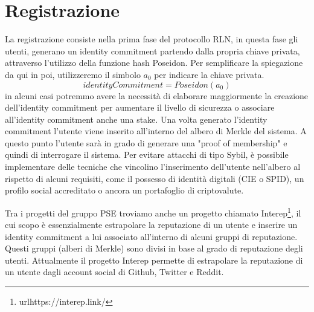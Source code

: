 \section{Registrazione}
La registrazione consiste nella prima fase del protocollo RLN, in questa fase gli utenti, generano un identity
commitment partendo dalla propria chiave privata, attraverso l'utilizzo della funzione hash Poseidon. Per semplificare
la spiegazione da qui in poi, utilizzeremo il simbolo $a_0$ per indicare la chiave privata.
$$identityCommitment = Poseidon(a_0)$$ in alcuni casi potremmo avere la necessità di elaborare maggiormente la creazione
dell'identity commitment per aumentare il livello di sicurezza o associare all'identity commitment anche una stake. Una
volta generato l'identity commitment l'utente viene inserito all'interno del albero di Merkle del sistema. A questo
punto l'utente sarà in grado di generare una "proof of membership" e quindi di interrogare il sistema. Per evitare
attacchi di tipo Sybil, è possibile implementare delle tecniche che vincolino l'inserimento dell'utente nell'albero al
rispetto di alcuni requisiti, come il possesso di identità digitali (CIE o SPID), un profilo social accreditato o ancora
un portafoglio di criptovalute.

Tra i progetti del gruppo PSE troviamo anche un progetto chiamato Interep\footnote{url{https://interep.link/}}, il cui
scopo è essenzialmente estrapolare la reputazione di un utente e inserire un identity commitment a lui associato
all'interno di alcuni gruppi di reputazione. Questi gruppi (alberi di Merkle) sono divisi in base al grado di
reputazione degli utenti. Attualmente il progetto Interep permette di estrapolare la reputazione di un utente dagli
account social di Github, Twitter e Reddit.